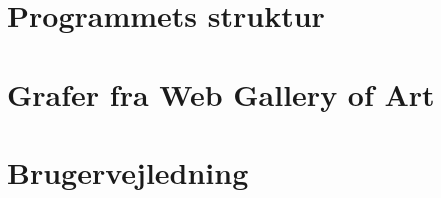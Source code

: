 {

\chapter{Programmets struktur\label{appendix_struktur}}


\chapter{Grafer fra Web Gallery of Art\label{appendix_grafer}}


\chapter{Brugervejledning\label{appendix_vejledning}}


}


